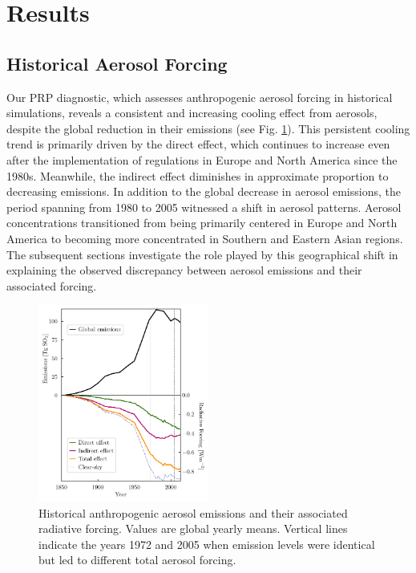 \documentclass[draft]{agujournal2019}
\begin{document}
\section{Results}

      \subsection{Historical Aerosol Forcing}
            Our PRP diagnostic, which assesses anthropogenic aerosol forcing in historical simulations, reveals a consistent and increasing cooling effect from aerosols, despite the global reduction in their emissions (see Fig. \ref{fig:global-forcing}). This persistent cooling trend is primarily driven by the direct effect, which continues to increase even after the implementation of regulations in Europe and North America since the 1980s. Meanwhile, the indirect effect diminishes in approximate proportion to decreasing emissions.
            In addition to the global decrease in aerosol emissions, the period spanning from 1980 to 2005 witnessed a shift in aerosol patterns. Aerosol concentrations transitioned from being primarily centered in Europe and North America to becoming more concentrated in Southern and Eastern Asian regions.
            The subsequent sections investigate the role played by this geographical shift in explaining the observed discrepancy between aerosol emissions and their associated forcing.

      \begin{figure}
            \centering
            \noindent\includegraphics[width=0.5\textwidth]{../../figures/figure1}
            \caption{Historical anthropogenic aerosol emissions and their associated radiative forcing. Values are global yearly means. Vertical lines indicate the years 1972 and 2005 when emission levels were identical but led to different total aerosol forcing.}
            \label{fig:global-forcing}
      \end{figure}
\end{document}
